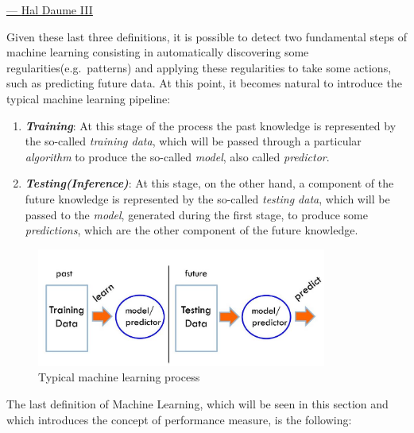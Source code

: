 \hspace{325pt}
\href{https://www.cs.ubc.ca/~murphyk/}{--- \underline{Hal Daume III}}

\vspace{10mm}

Given these last three definitions, it is possible to detect two
fundamental steps of machine learning consisting in automatically
discovering some regularities(e.g.\ patterns) and applying these
regularities to take some actions, such as predicting future data. At
this point, it becomes natural to introduce the typical machine learning
pipeline:

\begin{enumerate}
    \item \emph{\textbf{Training}}: At this stage of the process the
          past knowledge is represented by the so-called \emph{training data}, which will be passed through a particular \emph
          {algorithm} to produce the so-called \emph{model}, also called
          \emph{predictor}.
    \item \emph{\textbf{Testing(Inference)}}: At this stage, on the
          other hand, a component of the future knowledge is represented
          by the so-called \emph{testing data}, which will be passed to
          the \emph{model}, generated during the first stage, to produce
          some \emph{predictions}, which are the other component of the
          future knowledge.
\end{enumerate}

\vspace{5mm}

\begin{figure}[h]
    \centering
    \includegraphics[width=0.85\textwidth]{../img/Typical_ML_process}
    \caption{Typical machine learning process}
\end{figure}

\newpage

The last definition of Machine Learning, which will be seen in this
section and which introduces the concept of performance measure, is the
following:


